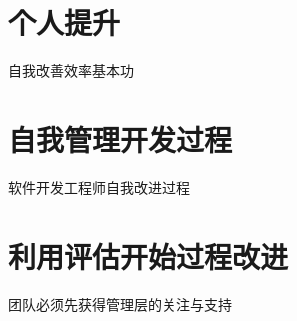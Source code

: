 \documentclass{book}        %
\begin{document}




\part{个人提升}自我改善效率基本功\\




\part{自我管理开发过程}软件开发工程师自我改进过程\\





\part{利用评估开始过程改进}团队必须先获得管理层的关注与支持\\

\end{document}
